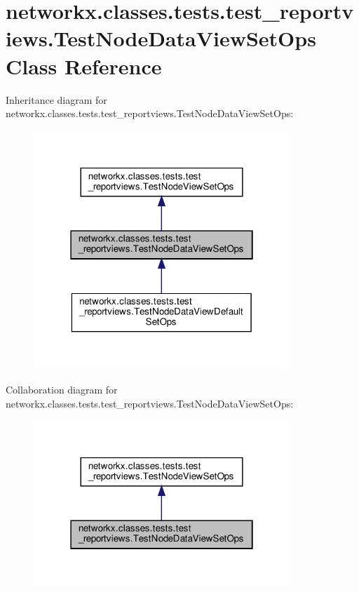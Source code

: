 \hypertarget{classnetworkx_1_1classes_1_1tests_1_1test__reportviews_1_1TestNodeDataViewSetOps}{}\section{networkx.\+classes.\+tests.\+test\+\_\+reportviews.\+Test\+Node\+Data\+View\+Set\+Ops Class Reference}
\label{classnetworkx_1_1classes_1_1tests_1_1test__reportviews_1_1TestNodeDataViewSetOps}


Inheritance diagram for networkx.\+classes.\+tests.\+test\+\_\+reportviews.\+Test\+Node\+Data\+View\+Set\+Ops\+:
\nopagebreak
\begin{figure}[H]
\begin{center}
\leavevmode
\includegraphics[width=274pt]{classnetworkx_1_1classes_1_1tests_1_1test__reportviews_1_1TestNodeDataViewSetOps__inherit__graph}
\end{center}
\end{figure}


Collaboration diagram for networkx.\+classes.\+tests.\+test\+\_\+reportviews.\+Test\+Node\+Data\+View\+Set\+Ops\+:
\nopagebreak
\begin{figure}[H]
\begin{center}
\leavevmode
\includegraphics[width=274pt]{classnetworkx_1_1classes_1_1tests_1_1test__reportviews_1_1TestNodeDataViewSetOps__coll__graph}
\end{center}
\end{figure}
